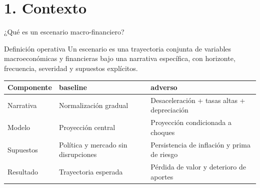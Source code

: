 \documentclass[10pt,aspectratio=169]{beamer}
\newcommand{\baseline}{\textcolor{MacropolTeal}{\textbf{baseline}}}
\newcommand{\adverso}{\textcolor{red!70!black}{\textbf{adverso}}}
\begin{document}
\section{1. Contexto}

\begin{frame}{¿Qué es un escenario macro-financiero?}
\begin{block}{Definición operativa}
Un escenario es una trayectoria conjunta de variables macroeconómicas y financieras bajo una narrativa específica, con horizonte, frecuencia, severidad y supuestos explícitos.
\end{block}

\begin{table}
\small
\begin{tabular}{p{3.2cm}p{4.2cm}p{4.2cm}}
\toprule
Componente & \baseline{} & \adverso{} \\
\midrule
Narrativa & Normalización gradual & Desaceleración + tasas altas + depreciación \\
Modelo & Proyección central & Proyección condicionada a choques \\
Supuestos & Política y mercado sin disrupciones & Persistencia de inflación y prima de riesgo \\
Resultado & Trayectoria esperada & Pérdida de valor y deterioro de aportes \\
\bottomrule
\end{tabular}
\end{table}
\end{frame}
\end{document}
